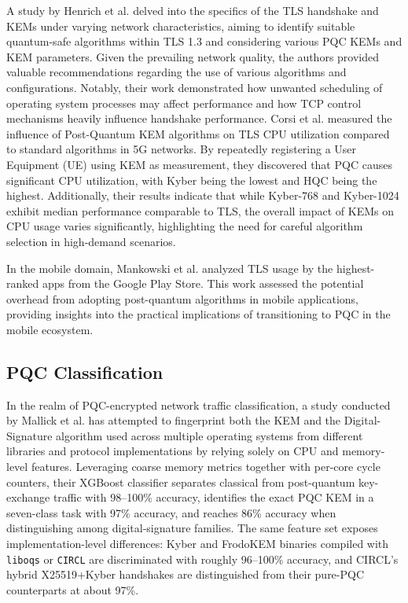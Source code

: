 \documentclass[10pt,journal]{IEEEtran}%
\begin{document}
A study by Henrich et al. \cite{PQC_KEMS} delved into the specifics of the TLS handshake and KEMs under varying network characteristics, aiming to identify suitable quantum-safe algorithms within TLS 1.3 and considering various PQC KEMs and KEM parameters. Given the prevailing network quality, the authors provided valuable recommendations regarding the use of various algorithms and configurations. Notably, their work demonstrated how unwanted scheduling of operating system processes may affect performance and how TCP control mechanisms heavily influence handshake performance. Corsi et al. \cite{corsi2025evaluation} measured the influence of Post-Quantum KEM algorithms on TLS CPU utilization compared to standard algorithms in 5G networks. By repeatedly registering a User Equipment (UE) using KEM as measurement, they discovered that PQC causes significant CPU utilization, with Kyber being the lowest and HQC being the highest. Additionally, their results indicate that while Kyber-768 and Kyber-1024 exhibit median performance comparable to TLS, the overall impact of KEMs on CPU usage varies significantly, highlighting the need for careful algorithm selection in high-demand scenarios.

In the mobile domain, Mankowski et al. \cite{TLS_Mobile} analyzed TLS usage by the highest-ranked apps from the Google Play Store. This work assessed the potential overhead from adopting post-quantum algorithms in mobile applications, providing insights into the practical implications of transitioning to PQC in the mobile ecosystem. 

\subsection{PQC Classification}

In the realm of PQC-encrypted network traffic classification, a study conducted by Mallick et al. \cite{mallick2025fingerprintingimplementationscryptographicprimitives} has attempted to fingerprint both the KEM and the Digital-Signature algorithm used across multiple operating systems from different libraries and protocol implementations by relying solely on CPU and memory-level features. Leveraging coarse memory metrics together with per-core cycle counters, their XGBoost classifier separates classical from post-quantum key-exchange traffic with 98–100\% accuracy,  identifies the exact PQC KEM in a seven-class task with 97\% accuracy, and reaches 86\% accuracy when distinguishing among digital-signature families. The same feature set exposes implementation-level differences: Kyber and FrodoKEM binaries compiled with \texttt{liboqs} or \texttt{CIRCL} are discriminated with roughly 96–100\% accuracy, and CIRCL’s hybrid X25519+Kyber handshakes are distinguished from their pure-PQC counterparts at about 97\%.
\end{document}
